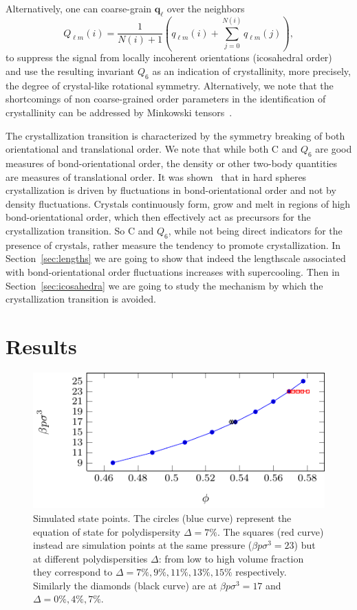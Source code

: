 \documentclass[twocolumn,superscriptaddress]{revtex4}
\begin{document}
Alternatively, one can coarse-grain $\mathbf{q}_\ell$ over the neighbors~\cite{lechner}
\begin{equation}
	Q_{\ell m}(i) = \frac{1}{N(i)+1}\left( q_{\ell m}(i) +  \sum_{j=0}^{N(i)} q_{\ell m}(j)\right), 
	\label{eq:Qlm}
\end{equation}
to suppress the signal from locally incoherent orientations (icosahedral order)~\cite{mathieu_icosahedra} and use the resulting invariant $Q_6$ as an indication of crystallinity, more precisely, the degree of crystal-like rotational symmetry. Alternatively, we note that the shortcomings of
non coarse-grained order parameters in the identification of crystallinity can be addressed by Minkowski tensors~\cite{kapfer2012jammed}.

The crystallization transition is characterized by
the symmetry breaking of both orientational and translational order.
We note that while both $\text{C}$ and $Q_6$ are good measures of bond-orientational order, the density or other two-body
quantities are measures of translational order.  It was shown~\cite{russo_hs} that in hard spheres crystallization is
driven by fluctuations in bond-orientational order and not by density fluctuations. Crystals continuously form, grow and melt
in regions of high bond-orientational order, which then effectively act as precursors for the crystallization transition.
So $\text{C}$ and $Q_6$, while not
being direct indicators for the presence of crystals, rather measure the tendency to promote crystallization. In Section~\ref{sec:lengths} we are going to show
that indeed the lengthscale associated with bond-orientational order fluctuations increases with supercooling. Then in Section~\ref{sec:icosahedra} we are going to study
the mechanism by which the crystallization transition is avoided.

\section{Results}\label{sec:results}

\begin{figure}
 \centering
 \includegraphics{fig_eos}
 \caption{Simulated state points. The circles (blue curve) represent the equation of state for polydispersity $\Delta=7\%$. The squares (red curve) instead are simulation points at the same pressure ($\beta p\sigma^3=23$) but at different polydispersities $\Delta$: from low to high volume fraction they correspond to $\Delta=7\%,9\%,11\%,13\%,15\%$ respectively. Similarly the diamonds (black curve) are at $\beta p\sigma^3=17$ and $\Delta=0\%,4\%,7\%$.}
 \label{fig:eos}
\end{figure}
\end{document}
